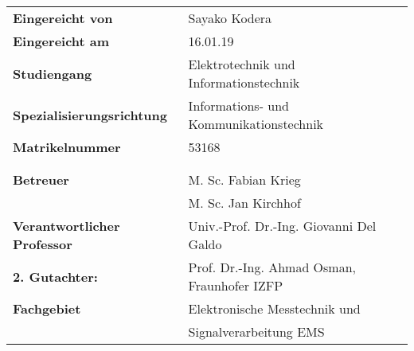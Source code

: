\begin{flushleft}
\normalsize
\renewcommand{\arraystretch}{1.5} 
\begin{tabular}{lll}
\textbf{Eingereicht von}  & Sayako Kodera\\
\textbf{Eingereicht am}  & 16.01.19 \\
\textbf{Studiengang} &  Elektrotechnik und Informationstechnik\\
\textbf{Spezialisierungsrichtung}  & Informations- und Kommunikationstechnik\\
\textbf{Matrikelnummer}  & 53168\\
&  \\\\
\textbf{Betreuer} &  M. Sc. Fabian Krieg\\
 & M. Sc. Jan Kirchhof\\
\textbf{Verantwortlicher Professor} &  Univ.-Prof. Dr.-Ing. Giovanni Del Galdo\\
\textbf{2. Gutachter:}  & Prof. Dr.-Ing. Ahmad Osman, Fraunhofer IZFP \\
\textbf{Fachgebiet} &  Elektronische Messtechnik und \\ & Signalverarbeitung EMS

\end{tabular}
\end{flushleft}


\newpage

